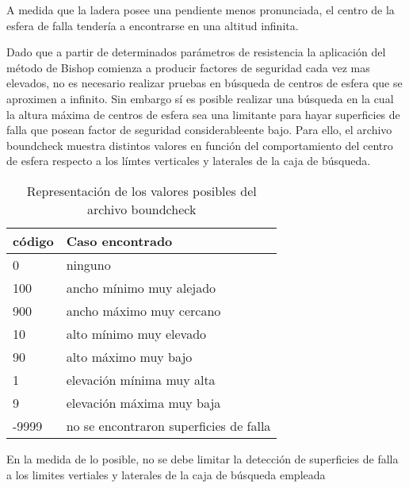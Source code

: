 A medida que la ladera posee una pendiente menos pronunciada, el centro de la esfera de falla tendería a encontrarse en una altitud infinita.

Dado que a partir de determinados parámetros de resistencia la aplicaci\'on del m\'etodo de Bishop comienza a producir factores de seguridad cada vez mas elevados, no es necesario realizar pruebas en b\'usqueda de centros de esfera que se aproximen a infinito.
Sin embargo s\'i es posible realizar una b\'usqueda en la cual la altura m\'axima de centros de esfera sea una limitante para hayar superficies de falla que posean factor de seguridad  considerableente bajo. Para ello, el archivo boundcheck muestra distintos valores en funci\'on del comportamiento del centro de esfera respecto a los l\'imtes verticales y laterales de la caja de b\'usqueda.

\begin{table}[]
\centering
\caption{Representaci\'on de los valores posibles del archivo boundcheck}
\label{my-label}
\begin{tabular}{ll}
\hline
\multicolumn{1}{|l|}{\textbf{c\'odigo}} & \multicolumn{1}{l|}{\textbf{Caso encontrado}} \\ \hline
0                                     & ninguno                                           \\
100                                   & ancho m\'inimo muy alejado                          \\
900                                   & ancho m\'aximo muy cercano                          \\
10                                    & alto m\'inimo muy elevado                           \\
90                                    & alto m\'aximo muy bajo                              \\
1                                     & elevaci\'on m\'inima muy alta                         \\
9                                     & elevaci\'on m\'axima muy baja                         \\
-9999                                 & no se encontraron superficies de falla           
\end{tabular}
\label{boundcheckTable}
\end{table}

En la medida de lo posible, no se debe limitar la detecci\'on de superficies de falla a los limites vertiales y laterales de la caja de b\'usqueda empleada
